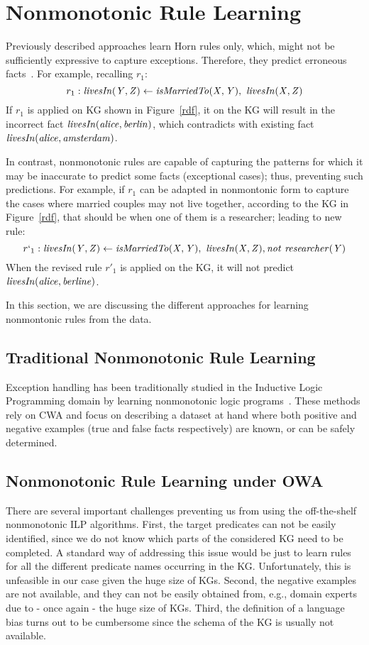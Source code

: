 \section{Nonmonotonic Rule Learning}\label{sec:nmrulelearn}

Previously described approaches learn Horn rules only, which, might not be sufficiently expressive to capture
exceptions. Therefore, they predict erroneous facts~\cite{rumis}. For example, recalling $r_1$:
\[r_1 : \mathit{livesIn(Y,Z)} \leftarrow \mathit{isMarriedTo(X,Y)},\ \mathit{livesIn(X,Z)} \]
If $r_1$ is applied on KG shown in Figure~\ref{rdf}, it on the KG will result in the incorrect fact $\mathit{livesIn(alice,berlin)}$, which contradicts with existing fact $\mathit{livesIn(alice, amsterdam)}$. 

In contrast, nonmonotonic rules are capable of capturing the patterns for which it may be inaccurate to predict some facts (\ie exceptional cases); thus, preventing such predictions. For example, if $r_1$ can be adapted in nonmontonic form to capture the cases where married couples may not live together, according to the KG in Figure~\ref{rdf}, that should be when one of them is a researcher; leading to new rule:
\[r`_1 : \mathit{livesIn(Y,Z)} \leftarrow \mathit{isMarriedTo(X,Y)},\ \mathit{livesIn(X,Z)}, \mathit{not}~ \mathit{researcher(Y)}\]
When the revised rule $r'_1$ is applied on the KG, it will not predict $\mathit{livesIn(alice,berline)}$. 

In this section, we are discussing the different approaches for learning nonmontonic rules from the data.


\subsection{Traditional Nonmonotonic Rule Learning}
Exception handling has been traditionally studied in the Inductive Logic Programming domain by learning nonmonotonic
logic programs~\cite{DBLP:conf/ijcai/InoueK97,DBLP:journals/tocl/Sakama05,R08,CorapiRL10,ILASP_system}. These methods
rely on CWA and focus on describing a dataset at hand  where both positive and negative examples (\ie true and false facts respectively) are known, or can be safely determined.   


\subsection{Nonmonotonic Rule Learning under OWA}
There are several important challenges preventing us from using the off-the-shelf nonmonotonic
ILP algorithms. First, the target predicates can not be easily identified, since
we do not know which parts of the considered KG need to be completed. A standard
way of addressing this issue would be just to learn rules for all the different predicate
names occurring in the KG. Unfortunately, this is unfeasible in our case given the huge
size of KGs. Second, the negative examples are not available, and they can not be easily
obtained from, e.g., domain experts due to - once again - the huge size of KGs. Third,
the definition of a language bias turns out to be cumbersome since the schema of the
KG is usually not available.



